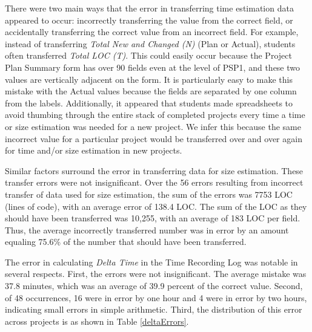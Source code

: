 There were two main ways that the error in transferring time estimation
data appeared to occur: incorrectly transferring the value from the correct
field, or accidentally transferring the correct value from an incorrect
field.  For example, instead of transferring {\it Total New and Changed
  (N)} (Plan or Actual), students often transferred {\it Total LOC (T)}.
This could easily occur because the Project Plan Summary form has over 90
fields even at the level of PSP1, and these two values are vertically
adjacent on the form. It is particularly easy to make this mistake with the
Actual values because the fields are separated by one column from the
labels.  Additionally, it appeared that students made spreadsheets to avoid
thumbing through the entire stack of completed projects every time a time
or size estimation was needed for a new project.  We infer this because the
same incorrect value for a particular project would be transferred over and
over again for time and/or size estimation in new projects.
    
Similar factors surround the error in transferring data for size
estimation.  These transfer errors were not insignificant.  Over the 56
errors resulting from incorrect transfer of data used for size estimation,
the sum of the errors was 7753 LOC (lines of code), with an average error
of 138.4 LOC.  The sum of the LOC as they should have been transferred was
10,255, with an average of 183 LOC per field.  Thus, the average
incorrectly transferred number was in error by an amount equaling 75.6\% of
the number that should have been transferred.
    
The error in calculating {\it Delta Time} in the Time Recording Log was
notable in several respects.  First, the errors were not insignificant.
The average mistake was 37.8 minutes, which was an average of 39.9 percent
of the correct value. Second, of 48 occurrences, 16 were in error by one
hour and 4 were in error by two hours, indicating small errors in simple
arithmetic. Third, the distribution of this error across projects is as
shown in Table \ref{deltaErrors}.

